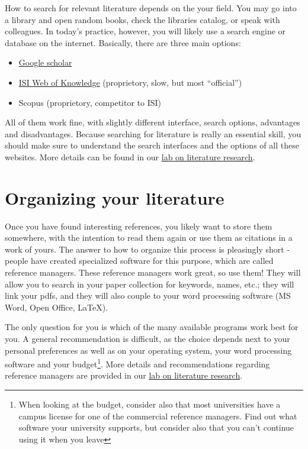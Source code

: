 \documentclass{tufte-book}
\begin{document}
How to search for relevant literature depends on the your field. You may go into a library and open random books, check the libraries catalog, or speak with colleagues. In today's practice, however, you will likely use a search engine or database on the internet. Basically, there are three main options: 

\begin{itemize}
\item \href{https://scholar.google.de/}{Google scholar} 
\item \href{http://webofknowledge.com/}{ISI Web of Knowledge} (proprietory, slow, but most ``official'')
\item Scopus (proprietory, competitor to ISI)
\end{itemize}

All  of them work fine, with slightly different interface, search options, advantages and disadvantages. Because searching for literature is really an essential skill, you should make sure to understand the search interfaces and the options of all these websites. More details can be found in our \href{https://github.com/florianhartig/ResearchSkills/tree/master/Labs/LiteratureResearch}{lab on literature research}. 

\section{Organizing your literature}

Once you have found interesting references, you likely want to store them somewhere, with the intention to read them again or use them as citations in a work of yours. The answer to how to organize this process is pleasingly short - people have created specialized software for this purpose, which are called reference managers. These reference managers work great, so use them! They will allow you to search in your paper collection for keywords, names, etc.; they will link your pdfs, and they will also couple to your word processing software (MS Word, Open Office, LaTeX). 


The only question for you is which of the many available programs work best for you. A general recommendation is difficult, as the choice depends next to your personal preferences as well as on your operating system, your word processing software and your budget\footnote{When looking at the budget, consider also that most universities have a campus license for one of the commercial reference managers. Find out what software your university supports, but consider also that you can't continue using it when you leave}. More details and recommendations regarding reference managers are provided in our \href{https://github.com/florianhartig/ResearchSkills/tree/master/Labs/LiteratureResearch}{lab on literature research}.
\end{document}
